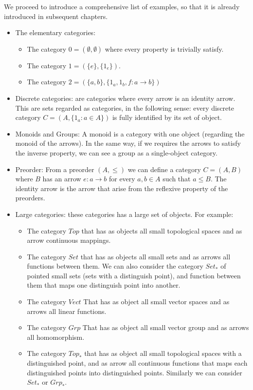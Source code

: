 We proceed to introduce a comprehensive list of examples, so that it is already introduced in subsequent chapters. 
\begin{example}

  \begin{itemize}  \ 
\item The elementary categories:
  \begin{itemize}
  \item The category $0 = ( \emptyset, \emptyset)$ where every property is trivially satisfy.
  \item The category $1 = (\{e\},\{1_e\})$.
  \item The category $2 = (\{a,b\},\{1_a,1_b,f:a\to b\})$\label{2-category}
  \end{itemize}

\item Discrete categories: are categories where every arrow is an identity arrow. This are sets regarded as categories, in the following sense: every discrete category $C=(A, \{1_a : a \in A\})$ is fully identified by its set of object.  
\item Monoids and Groups: A monoid is a category with one object (regarding the monoid of the arrows). In the same way, if we requires the arrows to satisfy the inverse property, we can see a group as a single-object category. 
\item Preorder: From a preorder $(A, \le)$ we can define a category $C = (A, B)$ where $B$ has an arrow $e: a \to b$ for every $a,b\in A$ such that $a \le B$. The identity arrow is the arrow that arise from the reflexive property of the preorders. 

\item Large categories: these categories has a large set of objects. For example:
  \begin{itemize}
  \item The category $Top$ that has as objects all small topological spaces and as arrow continuous mappings.
\item The category $Set$ that has as objects all small sets and as arrows all functions between them. We can also consider the category $Set_*$ of pointed small sets (sets with a distinguish point), and function between them that maps one distinguish point into another.  
\item The category $Vect$ That has as object all small vector spaces and as arrows all linear functions.
\item The category $Grp$ That has as object all small vector group and as arrows all homomorphism.
      \item The category $Top_*$ that has as object all small topological spaces with a distinguished point, and as arrow all continuous functions that maps each distinguished points into distinguished points. Similarly we can consider $Set_*$ or $Grp_*$.
\end{itemize}


\end{itemize}
\end{example}
